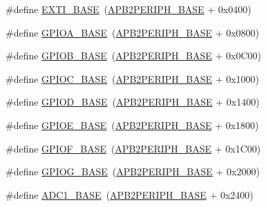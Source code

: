 \begin{DoxyCompactItemize}
\item 
\#define \mbox{\hyperlink{group___peripheral__memory__map_ga87371508b3bcdcd98cd1ec629be29061}{E\+X\+T\+I\+\_\+\+B\+A\+SE}}~(\mbox{\hyperlink{group___peripheral__memory__map_ga25b99d6065f1c8f751e78f43ade652cb}{A\+P\+B2\+P\+E\+R\+I\+P\+H\+\_\+\+B\+A\+SE}} + 0x0400)
\item 
\#define \mbox{\hyperlink{group___peripheral__memory__map_gad7723846cc5db8e43a44d78cf21f6efa}{G\+P\+I\+O\+A\+\_\+\+B\+A\+SE}}~(\mbox{\hyperlink{group___peripheral__memory__map_ga25b99d6065f1c8f751e78f43ade652cb}{A\+P\+B2\+P\+E\+R\+I\+P\+H\+\_\+\+B\+A\+SE}} + 0x0800)
\item 
\#define \mbox{\hyperlink{group___peripheral__memory__map_gac944a89eb789000ece920c0f89cb6a68}{G\+P\+I\+O\+B\+\_\+\+B\+A\+SE}}~(\mbox{\hyperlink{group___peripheral__memory__map_ga25b99d6065f1c8f751e78f43ade652cb}{A\+P\+B2\+P\+E\+R\+I\+P\+H\+\_\+\+B\+A\+SE}} + 0x0\+C00)
\item 
\#define \mbox{\hyperlink{group___peripheral__memory__map_ga26f267dc35338eef219544c51f1e6b3f}{G\+P\+I\+O\+C\+\_\+\+B\+A\+SE}}~(\mbox{\hyperlink{group___peripheral__memory__map_ga25b99d6065f1c8f751e78f43ade652cb}{A\+P\+B2\+P\+E\+R\+I\+P\+H\+\_\+\+B\+A\+SE}} + 0x1000)
\item 
\#define \mbox{\hyperlink{group___peripheral__memory__map_ga1a93ab27129f04064089616910c296ec}{G\+P\+I\+O\+D\+\_\+\+B\+A\+SE}}~(\mbox{\hyperlink{group___peripheral__memory__map_ga25b99d6065f1c8f751e78f43ade652cb}{A\+P\+B2\+P\+E\+R\+I\+P\+H\+\_\+\+B\+A\+SE}} + 0x1400)
\item 
\#define \mbox{\hyperlink{group___peripheral__memory__map_gab487b1983d936c4fee3e9e88b95aad9d}{G\+P\+I\+O\+E\+\_\+\+B\+A\+SE}}~(\mbox{\hyperlink{group___peripheral__memory__map_ga25b99d6065f1c8f751e78f43ade652cb}{A\+P\+B2\+P\+E\+R\+I\+P\+H\+\_\+\+B\+A\+SE}} + 0x1800)
\item 
\#define \mbox{\hyperlink{group___peripheral__memory__map_ga7f9a3f4223a1a784af464a114978d26e}{G\+P\+I\+O\+F\+\_\+\+B\+A\+SE}}~(\mbox{\hyperlink{group___peripheral__memory__map_ga25b99d6065f1c8f751e78f43ade652cb}{A\+P\+B2\+P\+E\+R\+I\+P\+H\+\_\+\+B\+A\+SE}} + 0x1\+C00)
\item 
\#define \mbox{\hyperlink{group___peripheral__memory__map_ga5d8ca4020f2e8c00bde974e8e7c13cfe}{G\+P\+I\+O\+G\+\_\+\+B\+A\+SE}}~(\mbox{\hyperlink{group___peripheral__memory__map_ga25b99d6065f1c8f751e78f43ade652cb}{A\+P\+B2\+P\+E\+R\+I\+P\+H\+\_\+\+B\+A\+SE}} + 0x2000)
\item 
\#define \mbox{\hyperlink{group___peripheral__memory__map_ga695c9a2f892363a1c942405c8d351b91}{A\+D\+C1\+\_\+\+B\+A\+SE}}~(\mbox{\hyperlink{group___peripheral__memory__map_ga25b99d6065f1c8f751e78f43ade652cb}{A\+P\+B2\+P\+E\+R\+I\+P\+H\+\_\+\+B\+A\+SE}} + 0x2400)

\end{DoxyCompactItemize}
